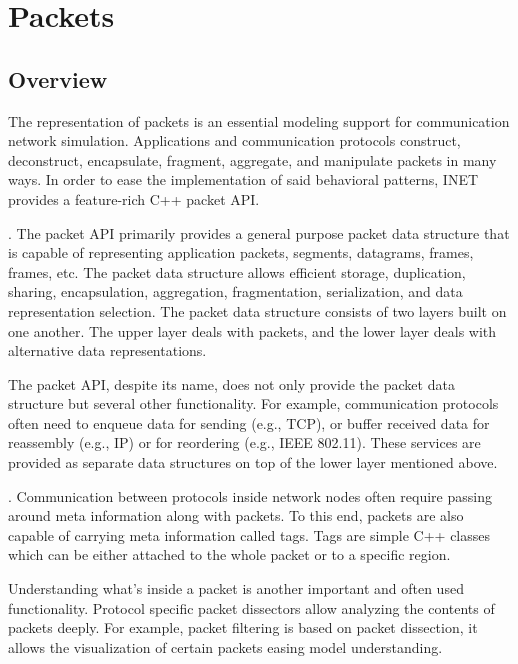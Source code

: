 \chapter{Packets}
\label{cha:packets}

\section{Overview}

The representation of packets is an essential modeling support for
communication network simulation. Applications and communication protocols
construct, deconstruct, encapsulate, fragment, aggregate, and manipulate
packets in many ways. In order to ease the implementation of said
behavioral patterns, INET provides a feature-rich C++ packet API.

.
The packet API primarily provides a general purpose packet data structure
that is capable of representing application packets, 
segments,  datagrams,  frames,
 frames, etc. The packet data structure allows
efficient storage, duplication, sharing, encapsulation, aggregation,
fragmentation, serialization, and data representation selection. The packet
data structure consists of two layers built on one another. The upper layer
deals with packets, and the lower layer deals with alternative data
representations.

The packet API, despite its name, does not only provide the packet data
structure but several other functionality. For example, communication
protocols often need to enqueue data for sending (e.g., TCP), or buffer
received data for reassembly (e.g., IP) or for reordering (e.g., IEEE
802.11). These services are provided as separate data structures on top of
the lower layer mentioned above.

.
Communication between protocols inside network nodes often require passing
around meta information along with packets. To this end, packets are also
capable of carrying meta information called tags. Tags are simple C++
classes which can be either attached to the whole packet or to a specific
region.

Understanding what's inside a packet is another important and often used
functionality. Protocol specific packet dissectors allow analyzing the
contents of packets deeply. For example, packet filtering is based on
packet dissection, it allows the visualization of certain packets easing
model understanding.

